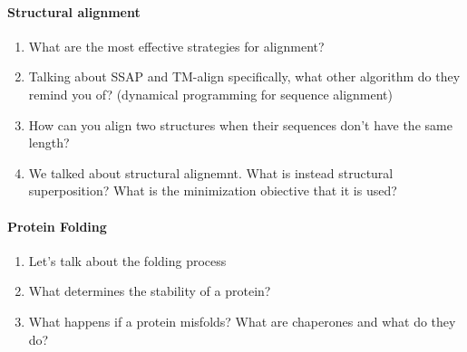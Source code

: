 \documentclass[11pt,a4paper]{article}
\begin{document}
\paragraph{Structural alignment}
\begin{enumerate}
    \item What are the most effective strategies for alignment? 
    \item Talking about SSAP and TM-align specifically, what other algorithm do they remind you of? (dynamical programming for sequence alignment)
    \item How can you align two structures when their sequences don't have the same length?
    \item We talked about structural alignemnt. What is instead structural superposition? What is the minimization obiective that it is used?
\end{enumerate}


\paragraph{Protein Folding}
\begin{enumerate}
    \item Let's talk about the folding process
    \item What determines the stability of a protein?
    \item What happens if a protein misfolds? What are chaperones and what do they do?
\end{enumerate}
\end{document}
